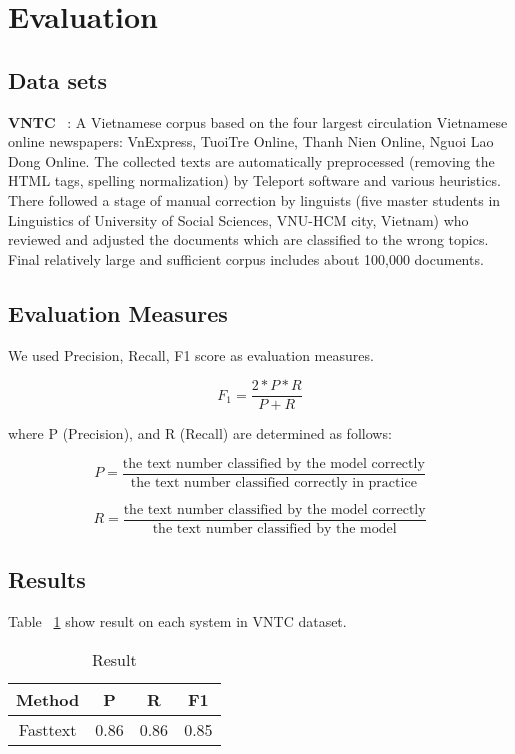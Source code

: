 \documentclass[11pt,a4paper]{article}
\begin{document}
\section{Evaluation}

\subsection{Data sets}

\noindent \textbf{VNTC} ~\cite{DBLP:conf/rivf/HoangDNN07}: A Vietnamese corpus based on the four largest
circulation Vietnamese online newspapers: VnExpress, TuoiTre Online, Thanh Nien Online, Nguoi Lao Dong Online. The collected texts are automatically preprocessed (removing the HTML tags, spelling normalization) by Teleport software and various heuristics. There followed a stage of manual correction by linguists (five master students in Linguistics of University of Social Sciences, VNU-HCM city, Vietnam) who reviewed and adjusted the documents which are
classified to the wrong topics. Final relatively large and sufficient corpus includes about 100,000 documents.

\subsection{Evaluation Measures}

We used Precision, Recall, F1 score as evaluation measures.

$$F_1 = \frac{2*P*R}{P + R}$$

\noindent where P (Precision), and R (Recall) are determined as follows:

$$P = \frac{\textrm{the text number classified by the model correctly}}{\textrm{the text number classified correctly in practice}}$$

$$R = \frac{\textrm{the text number classified by the model correctly}}{\textrm{the text number classified by the model}}$$

\subsection{Results}

Table ~\ref{tab:result} show result on each system in VNTC dataset.

\begin{table}
  \centering
  \begin{tabular}{cccc}
    \toprule
    Method & P & R & F1 \\
    \midrule
    Fasttext  & 0.86 & 0.86 & 0.85 \\
    \bottomrule
  \end{tabular}

  \label{tab:result}
  \caption{\small Result}
\end{table}
\end{document}
